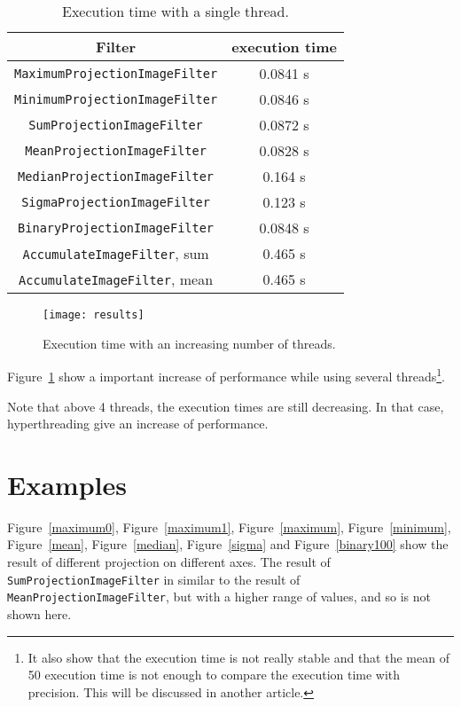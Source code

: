 \documentclass{InsightArticle}
\begin{document}
\begin{table}[htbp]
\centering
\begin{tabular}{cc}
\hline
Filter & execution time \\
\hline
\hline
\verb$MaximumProjectionImageFilter$ & 0.0841 s \\
\verb$MinimumProjectionImageFilter$  & 0.0846 s\\
\verb$SumProjectionImageFilter$  & 0.0872 s\\
\verb$MeanProjectionImageFilter$  & 0.0828 s\\
\verb$MedianProjectionImageFilter$  & 0.164 s\\
\verb$SigmaProjectionImageFilter$  & 0.123 s\\
\verb$BinaryProjectionImageFilter$  & 0.0848 s\\
\verb$AccumulateImageFilter$, sum  & 0.465 s\\
\verb$AccumulateImageFilter$, mean  & 0.465 s\\
\hline
\end{tabular}
\caption{Execution time with a single thread.\label{perf}}
\end{table}

\begin{figure}[htbp]
\centering
\texttt{[image: results]}
\caption{Execution time with an increasing number of threads.\label{results}}
\end{figure}

Figure~\ref{results} show a important increase of performance while using several
threads\footnote{It also show that the execution time is not really stable
and that the mean of 50 execution time is not enough to compare the execution
time with precision. This will be discussed in another article.}.

Note that above 4 threads, the execution times are still decreasing. In that case,
hyperthreading give an increase of performance.

\section{Examples}
Figure~\ref{maximum0}, Figure~\ref{maximum1}, Figure~\ref{maximum},
Figure~\ref{minimum}, Figure~\ref{mean}, Figure~\ref{median},
Figure~\ref{sigma} and Figure~\ref{binary100} show the result
of different projection on different axes. The result of
\verb$SumProjectionImageFilter$ in similar to the result of \verb$MeanProjectionImageFilter$,
but with a higher range of values, and so is not shown here.
\end{document}
